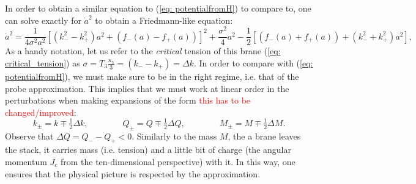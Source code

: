 In order to obtain a similar equation to (\ref{eq: potentialfromH}) to compare to, one can solve exactly for $\dot{a}^{2}$ to obtain a Friedmann-like equation:
\begin{equation}\label{eq: FriedmannfromJC}
   \dot{a}^2= \frac{1}{4 \sigma^{2} a^{2}} \left[\left(k_{-}^{2}-k_{+}^{2}\right)a^{2} +\left(f_{-}(a) - f_{+}(a)\right)\right]^{2} + \frac{\sigma^{2}}{4}a^{2} -\frac{1}{2}\left[\left(f_{-}(a) + f_{+}(a)\right) + \left(k_{-}^{2}+k_{+}^{2}\right)a^{2} \right],
\end{equation}
As a handy notation, let us refer to the \textit{critical} tension of this brane (\ref{eq: critical_tension}) as $\sigma =T_3 \frac{\kappa_5}{3} = (k_- -k_+) = \Delta k$. In order to compare with  (\ref{eq: potentialfromH}), we must make sure to be in the right regime, i.e. that of the probe approximation. This implies that we must work at linear order in the perturbations when making expansions of the form \textcolor{red}{this has to be changed/improved}:
\begin{equation}\label{eq: approximations_bh}
    k_{\pm}=k\mp \tfrac{1}{2} \Delta k, \quad\quad\quad\quad Q_{\pm}=Q\mp \tfrac{1}{2} \Delta Q, \quad\quad\quad\quad M_{\pm}=M\mp \tfrac{1}{2} \Delta M.
\end{equation}
Observe that  $\Delta Q= Q _- - Q_+<0$. Similarly to the mass $M$, the a brane leaves the stack, it carries mass (i.e. tension) and a little bit of charge (the angular momentum $J_{c}$ from the ten-dimensional perspective) with it. In this way, one ensures that the physical picture is respected by the approximation.

